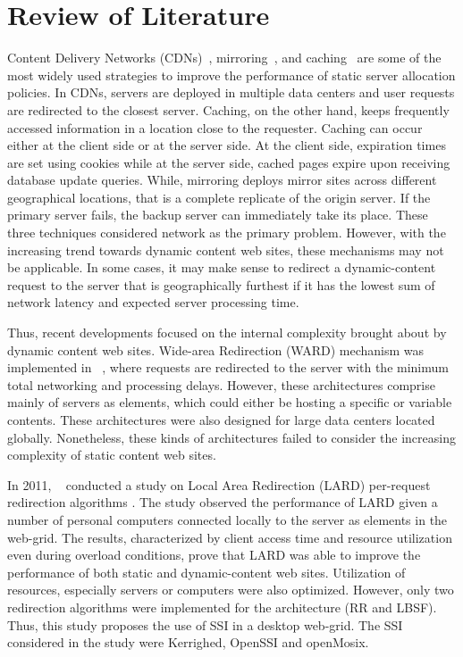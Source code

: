 \documentclass[preprint]{acm_proc_article-sp}
\begin{document}
\section{Review of Literature}
Content Delivery Networks (CDNs)~\citep{presti02,lu08,leong09}, mirroring~\citep{myers99,gavrilovska01}, and caching~\citep{zou03,sosasosa03,bhattacharjee05} are some of the most widely used strategies to improve the performance of static server allocation policies. In CDNs, servers are deployed in multiple data centers and user requests are redirected to the closest server. Caching, on the other hand, keeps frequently accessed information in a location close to the requester. Caching can occur either at the client side or at the server side. At the client side, expiration times are set using cookies while at the server side, cached pages expire upon receiving database update queries. While, mirroring deploys mirror sites across different geographical locations, that is a complete replicate of the origin server. If the primary server fails, the backup server can immediately take its place. These three techniques considered network as the primary problem. However, with the increasing trend towards dynamic content web sites, these mechanisms may not be applicable. In some cases, it may make sense to redirect a dynamic-content request to the server that is geographically furthest if it has the lowest sum of network latency and expected server processing time.

Thus, recent developments focused on the internal complexity brought about by dynamic content web sites. Wide-area Redirection (WARD) mechanism was implemented in ~\citet{ranjan08}, where requests are redirected to the server with the minimum total networking and processing delays. However, these architectures comprise mainly of servers as elements, which could either be hosting a specific or variable contents.  These architectures were also designed for large data centers located globally.  Nonetheless, these kinds of architectures failed to consider the increasing complexity of static content web sites.

In 2011, ~\citet{derobles11} conducted a study on Local Area Redirection (LARD) per-request redirection algorithms . The study observed the performance of LARD given a number of personal computers connected locally to the server as elements in the web-grid. The results, characterized by client access time and resource utilization even during overload conditions, prove that LARD was able to improve the performance of both static and dynamic-content web sites. Utilization of resources, especially servers or computers were also optimized. However, only two redirection algorithms were implemented for the architecture (RR and LBSF). Thus, this study proposes the use of SSI in a desktop web-grid. The SSI considered in the study were Kerrighed, OpenSSI and openMosix.
\end{document}

